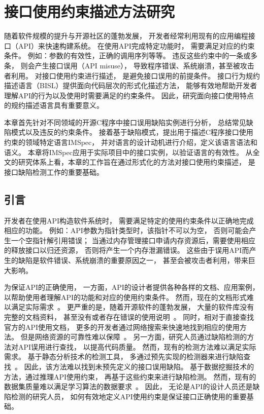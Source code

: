 \chapter{接口使用约束描述方法研究}
\label{cha:impsec}
随着软件规模的提升与开源社区的蓬勃发展，
开发者经常利用现有的应用编程接口（API）来快速构建系统。
在使用API完成特定功能时，
需要满足对应的约束条件。
例如：参数的有效性，正确的调用序列等等。
违反这些约束中的一条或多条，
则会产生接口误用（API misuse），
导致程序错误、系统崩溃，甚至被攻击者利用。
对接口使用约束进行描述，
是避免接口误用的前提条件。
接口行为规约描述语言（BISL）提供面向代码层次的形式化描述方法，
能够有效地帮助开发者理解API的行为以及使用时需要满足的约束条件。
因此，研究面向接口使用特点的规约描述语言具有重要意义。


本章首先针对不同领域的开源C程序中接口误用缺陷实例进行分析，
总结常见缺陷模式以及违反的约束条件。
接着基于缺陷模式，提出用于描述C程序接口使用约束的领域特定语言IMSpec，
并对语言的设计动机进行介绍，定义该语言语法和语义。
本章将IMSpec应用于实际项目中的接口实例，以验证语言的有效性。
从全文的研究体系上看，本章的工作旨在通过形式化的方法对接口使用约束描述，
是接口缺陷检测工作的重要基础。


\section{引言}
开发者在使用API构造软件系统时，
需要满足特定的使用约束条件以正确地完成相应的功能。
例如：API参数为指针类型时，该指针不可以为空，
否则可能会产生一个空指针解引用错误；
当通过内存管理接口申请内存资源后，需要使用相应的释放接口以归还资源，
否则将产生一个内存泄漏错误。
这些由于误用API而产生的缺陷是软件错误、系统崩溃的重要原因之一，
甚至会被攻击者利用，带来巨大影响。


为保证API的正确使用，
一方面，API的设计者提供各种各样的文档、应用案例，
以帮助使用者理解API的功能和对应的使用约束条件。
然而，现在的文档形式难以满足实际需求~\cite{09-icse-doc}。
更严重的是，随着开源软件的蓬勃发展，
大量的软件库没有完整的文档资料，
甚至没有或者存在错误的使用说明~\cite{15-ieee-doc-fail, 17-icse-api-doc}。
同时，相对于直接查找官方的API使用文档，
更多的开发者通过网络搜索来快速地找到相应的使用方法。
但是网络资源的可靠性难以保障~\cite{18-icse-stack}。
另一方面，研究人员通过缺陷检测的方法对API误用进行查找，
以提高代码质量。
然而，现有的检测方法难以满足实际需求。
基于静态分析技术的检测工具，
多通过预先实现的检测器来进行缺陷查找~\cite{15-coufless-static-survey}。
因此，该方法难以找到未预先定义的接口误用缺陷。
基于数据挖掘技术的方法，通过推理API使用约束，
再基于这些约束来进行缺陷检测。
然而，现有的数据集质量难以满足学习算法的数据要求~\cite{survey18}。
因此，
无论是API的设计人员还是缺陷检测的研究人员，
如何有效地定义API使用约束是保证接口正确使用的重要基础。


